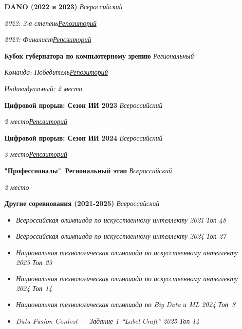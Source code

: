 
\textbf{DANO (2022 и 2023)} \hfill \emph{Всероссийский}

\textit{2022: 2-я степень}\hfill \emph{\href{https://github.com/D1ffic00lt/dano-olympiad-final-stage}{Репозиторий}}\vspace{0cm}

\textit{2023: Финалист}\hfill \emph{\href{https://github.com/D1ffic00lt/dano-2023}{Репозиторий}}\vspace{0.1cm}

\textbf{Кубок губернатора по компьютерному зрению} \hfill \emph{Региональный}

\textit{Команда: Победитель}\hfill \emph{\href{https://github.com/D1ffic00lt/computer-vision-cup}{Репозиторий}}\vspace{0cm}

\textit{Индивидуальный: 2 место}\vspace{0.1cm}


\textbf{Цифровой прорыв: Сезон ИИ 2023} \hfill \emph{Всероссийский}

\textit{2 место}\hfill \emph{\href{https://github.com/llitone/rutube-video-captioning}{Репозиторий}}\vspace{0.1cm}


\textbf{Цифровой прорыв: Сезон ИИ 2024} \hfill \emph{Всероссийский}

\textit{3 место}\hfill \emph{\href{https://github.com/D1ffic00lt/Sky-Eye}{Репозиторий}}\vspace{0.1cm}

\textbf{"Профессионалы"\ Региональный этап} \hfill \emph{Всероссийский}

\textit{2 место}\vspace{0.1cm}

\textbf{Другие соревнования (2021-2025)} \hfill \emph{Всероссийский}

\begin{itemize}[
    label=$\cdot$, 
    itemsep=0.1em,
    topsep=0pt,
    parsep=0pt
]
    \item \textit{Всероссийская олимпиада по искусственному интеллекту 2021} \hfill \emph{Топ 48}
    \item \textit{Всероссийская олимпиада по искусственному интеллекту 2024} \hfill \emph{Топ 27}
    \item \textit{Национальная технологическая олимпиада по искусственному интеллекту 2023} \hfill \emph{Топ 23}
    \item \textit{Национальная технологическая олимпиада по искусственному интеллекту 2024} \hfill \emph{Топ 14}
    \item \textit{Национальная технологическая олимпиада по Big Data и ML 2024} \hfill \mbox{\emph{Топ 8}\hspace{1ex}} 
    \item \textit{Data Fusion Contest — Задание 1 “Label Craft” 2025} \hfill \emph{Топ 14}
\end{itemize}